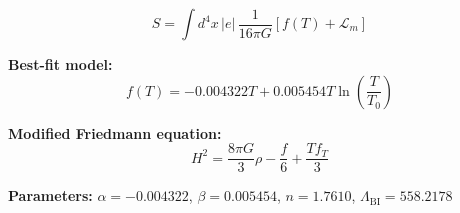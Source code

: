 
\begin{equation}
  S = \int d^4x \, |e| \, \frac{1}{16\pi G} \left[ f(T) + \mathcal{L}_m \right]
\end{equation}

\textbf{Best-fit model:}
\begin{equation}
  f(T) = -0.004322 T + 0.005454 T \ln\!\left(\frac{T}{T_0}\right)
\end{equation}

\textbf{Modified Friedmann equation:}
\begin{equation}
  H^2 = \frac{8\pi G}{3} \rho - \frac{f}{6} + \frac{T f_T}{3}
\end{equation}

\textbf{Parameters:}
$\alpha = -0.004322$, \quad
$\beta = 0.005454$, \quad
$n = 1.7610$, \quad
$\Lambda_{\text{BI}} = 558.2178$